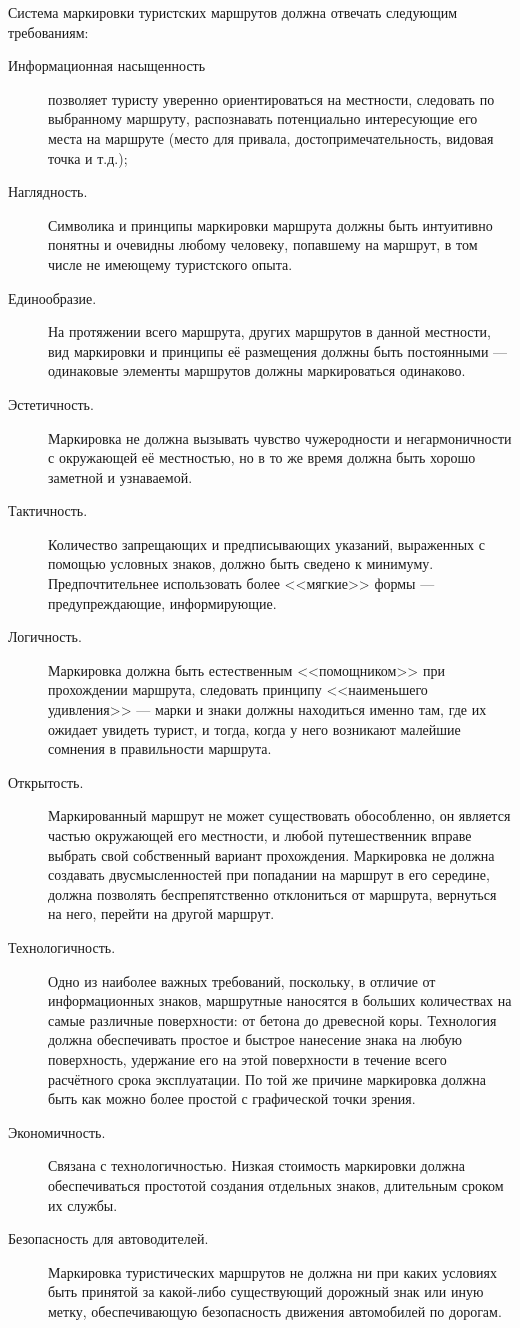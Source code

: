\documentclass[a5paper,10pt,titlepage]{extarticle}
\begin{document}
Система маркировки туристских маршрутов должна отвечать следующим требованиям:
\begin{description}
	\item[Информационная насыщенность] позволяет туристу уверенно ориентироваться на местности, следовать по
		выбранному маршруту, распознавать потенциально интересующие его места на маршруте (место для привала,
		достопримечательность, видовая точка и т.д.);
	\item[Наглядность.] Символика и принципы маркировки маршрута должны быть интуитивно понятны и очевидны любому
		человеку, попавшему на маршрут, в том числе не имеющему туристского опыта.
	\item[Единообразие.] На протяжении всего маршрута, других маршрутов в данной местности, вид маркировки и
		принципы её размещения должны быть постоянными --- одинаковые элементы маршрутов должны маркироваться
		одинаково.
	\item[Эстетичность.] Маркировка не должна вызывать чувство чужеродности и негармоничности с окружающей её
		местностью, но в то же время должна быть хорошо заметной и узнаваемой.
	\item[Тактичность.] Количество запрещающих и предписывающих указаний, выраженных с помощью условных знаков,
		должно быть сведено к минимуму. Предпочтительнее использовать более <<мягкие>> формы ---
		предупреждающие, информирующие.
	\item[Логичность.] Маркировка должна быть естественным <<помощником>> при прохождении маршрута, следовать
		принципу <<наименьшего удивления>> --- марки и знаки должны находиться именно там, где их ожидает
		увидеть турист, и тогда, когда у него возникают малейшие сомнения в правильности маршрута.
	\item[Открытость.] Маркированный маршрут не может существовать обособленно, он является частью окружающей
		его местности, и любой путешественник вправе выбрать свой собственный вариант прохождения. Маркировка не
		должна создавать двусмысленностей при попадании на маршрут в его середине, должна позволять
		беспрепятственно отклониться от маршрута, вернуться на него, перейти на другой маршрут.
	\item[Технологичность.] Одно из наиболее важных требований, поскольку, в отличие от информационных знаков,
		маршрутные наносятся в больших количествах на самые различные поверхности: от бетона до древесной коры.
		Технология должна обеспечивать простое и быстрое нанесение знака на любую поверхность, удержание его на
		этой поверхности в течение всего расчётного срока эксплуатации. По той же причине маркировка должна
		быть как можно более простой с графической точки зрения.
	\item[Экономичность.] Связана с технологичностью. Низкая стоимость маркировки должна обеспечиваться простотой
		создания отдельных знаков, длительным сроком их службы.
	\item[Безопасность для автоводителей.] Маркировка туристических маршрутов не должна ни при каких условиях быть
		принятой за какой-либо существующий дорожный знак или иную метку, обеспечивающую безопасность движения
		автомобилей по дорогам.
\end{description}
\end{document}
